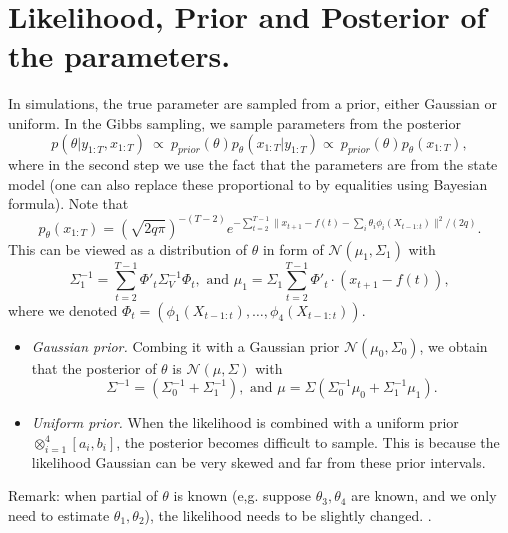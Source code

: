 \documentclass[12pt]{article}
\newcommand{\fblue}[1]{\textcolor{blue}{{#1}}}
\numberwithin{equation}{section}
\numberwithin{theorem}{section}
\begin{document}
 
\section{ Likelihood, Prior and Posterior of the parameters.} In simulations, the true parameter are sampled from a prior, either Gaussian or uniform. 
In the Gibbs sampling, we sample parameters from the posterior 
\[
p(\theta | y_{1:T},x_{1:T}) \ \propto \  p_{prior}(\theta) p_{\theta}(x_{1:T}|y_{1:T}) \propto\  p_{prior}(\theta) p_{\theta}(x_{1:T}),
\]
where in the second step we use the fact that the parameters are from the state model (one can also replace these proportional to by equalities using Bayesian formula).  Note that  
\[ 
p_{\theta}(x_{1:T}) = (\sqrt{2q\pi})^{-(T-2)} e^{-\sum_{t=2}^{T-1} \| x_{t+1} -f(t)- \sum_i \theta_i \phi_i(X_{t-1:t})\|^2/(2q) }. 
\]
This can be viewed as a distribution of $\theta$ in form of $\mathcal{N}(\mu_1, \Sigma_1 )$ with 
\[\Sigma_1^{-1} = \sum_{t=2}^{T-1} \Phi'_t \Sigma_V^{-1} \Phi_t, \text{ and } \mu_1= \Sigma_1 \sum_{t=2}^{T-1} \Phi'_t \cdot (x_{t+1}-f(t)),\]
where we denoted $\Phi_t= (\phi_1(X_{t-1:t}), \dots, \phi_4(X_{t-1:t}) )$.  
\begin{itemize}\setlength\itemsep{-1mm}
\item  \emph{Gaussian prior.} Combing it with a Gaussian prior $\mathcal{N}(\mu_0, \Sigma_0 )$, we obtain that the posterior of $\theta$ is $\mathcal{N}(\mu, \Sigma )$ with  
\[ \Sigma^{-1} = (\Sigma_0^{-1} + \Sigma_1^{-1} ) , \text{ and } \mu= \Sigma (\Sigma_0^{-1}\mu_0 + \Sigma_1^{-1}\mu_1). \]
\item \emph{Uniform prior.} When the likelihood is combined with a uniform prior $\otimes_{i=1}^4 [a_i,b_i]$, the posterior becomes difficult to sample. This is because the likelihood Gaussian can be very skewed and far from these prior intervals. 
 \end{itemize}
Remark:  when partial of $\theta$ is known (e,g. suppose $\theta_3,\theta_4$ are known, and we only need to estimate $\theta_1,\theta_2$), the likelihood needs to be slightly changed. . 
\end{document}
